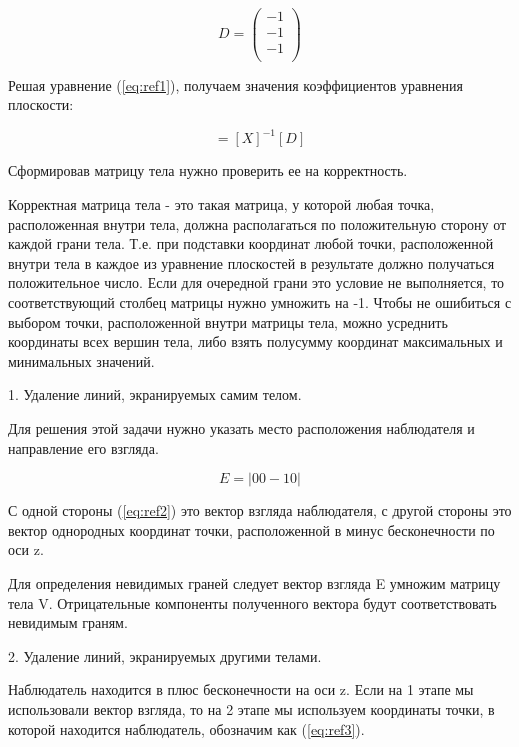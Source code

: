 ~

\begin{equation}
D = \left(
\begin{array}{c}
-1\\
-1\\
-1\\
\end{array}
\right)
\end{equation}

Решая уравнение (\ref{eq:ref1}), получаем значения коэффициентов уравнения плоскости: 

\begin{equation}
	[C] = [X]^{-1}[D]	
\end{equation} 

Сформировав матрицу тела нужно проверить ее на корректность. 

Корректная матрица тела - это такая матрица, у которой любая точка, расположенная внутри тела, должна располагаться по положительную сторону от каждой грани тела. Т.е. при подставки координат любой точки, расположенной внутри тела в каждое из уравнение плоскостей в результате должно получаться положительное число. Если для очередной грани это условие не выполняется, то соответствующий столбец матрицы нужно умножить на -1. Чтобы не ошибиться с выбором точки, расположенной внутри матрицы тела, можно усреднить координаты всех вершин тела, либо взять полусумму координат максимальных и минимальных значений.

1. Удаление линий, экранируемых самим телом.

Для решения этой задачи нужно указать место расположения наблюдателя и направление его взгляда.

\begin{equation}
 E = |00-10|
 \label{eq:ref2}	
\end{equation} 

С одной стороны (\ref{eq:ref2}) это вектор взгляда наблюдателя, с другой стороны это вектор однородных координат точки, расположенной в минус бесконечности по оси z.

Для определения невидимых граней следует вектор взгляда E умножим матрицу тела V. Отрицательные компоненты полученного вектора будут соответствовать невидимым граням.

2. Удаление линий, экранируемых другими телами.

Наблюдатель находится в плюс бесконечности на оси z. Если на 1 этапе мы использовали вектор взгляда, то на 2 этапе мы используем координаты точки, в которой находится наблюдатель, обозначим как (\ref{eq:ref3}).


